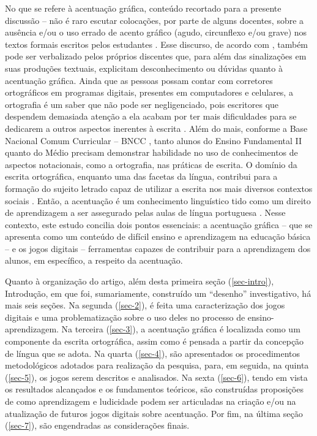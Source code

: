 \documentclass{textolivre}
\begin{document}
No que se refere à acentuação gráfica, conteúdo recortado para a presente discussão – não é raro escutar colocações, por parte de alguns docentes, sobre a ausência e/ou o uso errado de acento gráfico (agudo, circunflexo e/ou grave) nos textos formais escritos pelos estudantes \cite{cristofaro2020, couto+guimaraes2020}. Esse discurso, de acordo com \textcite{couto+guimaraes2020}, também pode ser verbalizado pelos próprios discentes que, para além das sinalizações em suas produções textuais, explicitam desconhecimento ou dúvidas quanto à acentuação gráfica. Ainda que as pessoas possam contar com corretores ortográficos em programas digitais, presentes em computadores e celulares, a ortografia é um saber que não pode ser negligenciado, pois escritores que despendem demasiada atenção a ela acabam por ter mais dificuldades para se dedicarem a outros aspectos inerentes à escrita \cite{treiman2014}. Além do mais, conforme a Base Nacional Comum Curricular – BNCC \cite{brasil2017, brasil2018}, tanto alunos do Ensino Fundamental II quanto do Médio precisam demonstrar habilidade no uso de conhecimentos de aspectos notacionais, como a ortografia, nas práticas de escrita. O domínio da escrita ortográfica, enquanto uma das facetas da língua, contribui para a formação do sujeito letrado capaz de utilizar a escrita nos mais diversos contextos sociais \cite{soares2004, soares2018}. Então, a acentuação é um conhecimento linguístico tido como um direito de aprendizagem a ser assegurado pelas aulas de língua portuguesa \cite{brasil2018}. Nesse contexto, este estudo concilia dois pontos essenciais: a acentuação gráfica – que se apresenta como um conteúdo de difícil ensino e aprendizagem na educação básica – e os jogos digitais – ferramentas capazes de contribuir para a aprendizagem dos alunos, em específico, a respeito da acentuação.

Quanto à organização do artigo, além desta primeira seção (\ref{sec-intro}), Introdução, em que foi, sumariamente, construído um “desenho” investigativo, há mais seis seções. Na segunda (\ref{sec-2}), é feita uma caracterização dos jogos digitais e uma problematização sobre o uso deles no processo de ensino-aprendizagem. Na terceira (\ref{sec-3}), a acentuação gráfica é localizada como um componente da escrita ortográfica, assim como é pensada a partir da concepção de língua que se adota. Na quarta (\ref{sec-4}), são apresentados os procedimentos metodológicos adotados para realização da pesquisa, para, em seguida, na quinta (\ref{sec-5}), os jogos serem descritos e analisados. Na sexta (\ref{sec-6}), tendo em vista os resultados alcançados e os fundamentos teóricos, são construídas proposições de como aprendizagem e ludicidade podem ser articuladas na criação e/ou na atualização de futuros jogos digitais sobre acentuação. Por fim, na última seção (\ref{sec-7}), são engendradas as considerações finais.
\end{document}
